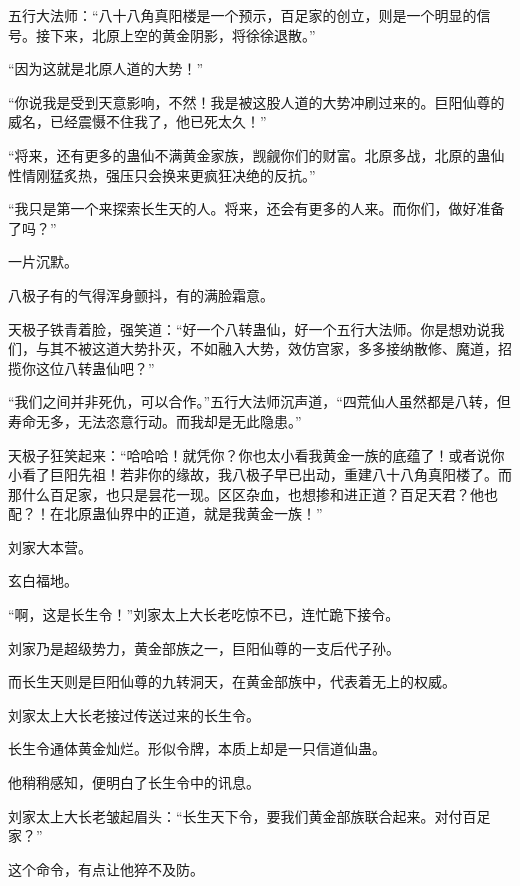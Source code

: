 
\begin{this_body}



五行大法师：“八十八角真阳楼是一个预示，百足家的创立，则是一个明显的信号。接下来，北原上空的黄金阴影，将徐徐退散。”

“因为这就是北原人道的大势！”

“你说我是受到天意影响，不然！我是被这股人道的大势冲刷过来的。巨阳仙尊的威名，已经震慑不住我了，他已死太久！”

“将来，还有更多的蛊仙不满黄金家族，觊觎你们的财富。北原多战，北原的蛊仙性情刚猛炙热，强压只会换来更疯狂决绝的反抗。”

“我只是第一个来探索长生天的人。将来，还会有更多的人来。而你们，做好准备了吗？”

一片沉默。

八极子有的气得浑身颤抖，有的满脸霜意。

天极子铁青着脸，强笑道：“好一个八转蛊仙，好一个五行大法师。你是想劝说我们，与其不被这道大势扑灭，不如融入大势，效仿宫家，多多接纳散修、魔道，招揽你这位八转蛊仙吧？”

“我们之间并非死仇，可以合作。”五行大法师沉声道，“四荒仙人虽然都是八转，但寿命无多，无法恣意行动。而我却是无此隐患。”

天极子狂笑起来：“哈哈哈！就凭你？你也太小看我黄金一族的底蕴了！或者说你小看了巨阳先祖！若非你的缘故，我八极子早已出动，重建八十八角真阳楼了。而那什么百足家，也只是昙花一现。区区杂血，也想掺和进正道？百足天君？他也配？！在北原蛊仙界中的正道，就是我黄金一族！”

刘家大本营。

玄白福地。

“啊，这是长生令！”刘家太上大长老吃惊不已，连忙跪下接令。

刘家乃是超级势力，黄金部族之一，巨阳仙尊的一支后代子孙。

而长生天则是巨阳仙尊的九转洞天，在黄金部族中，代表着无上的权威。

刘家太上大长老接过传送过来的长生令。

长生令通体黄金灿烂。形似令牌，本质上却是一只信道仙蛊。

他稍稍感知，便明白了长生令中的讯息。

刘家太上大长老皱起眉头：“长生天下令，要我们黄金部族联合起来。对付百足家？”

这个命令，有点让他猝不及防。


\end{this_body}
